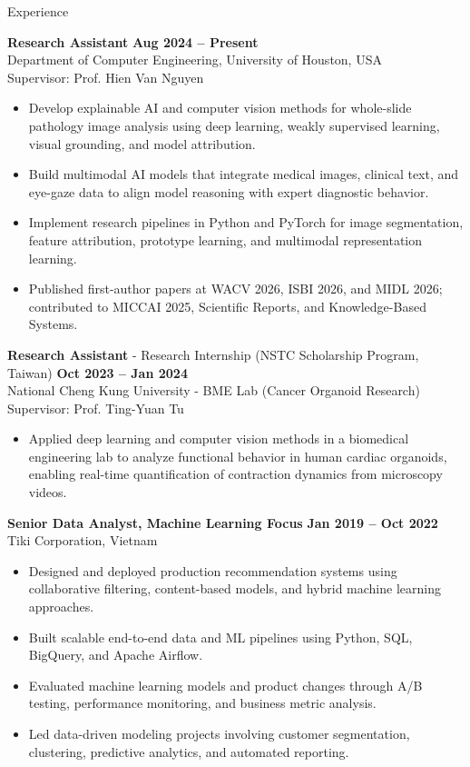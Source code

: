 \documentclass[11pt]{resume}
\begin{document}
\begin{rSection}{Experience}

\textbf{Research Assistant} \hfill \textbf{Aug 2024 – Present} \\
Department of Computer Engineering, University of Houston, USA \\
Supervisor: Prof. Hien Van Nguyen

\begin{itemize}
    \item Develop explainable AI and computer vision methods for whole-slide pathology image analysis using deep learning, weakly supervised learning, visual grounding, and model attribution.
    \item Build multimodal AI models that integrate medical images, clinical text, and eye-gaze data to align model reasoning with expert diagnostic behavior.
    \item Implement research pipelines in Python and PyTorch for image segmentation, feature attribution, prototype learning, and multimodal representation learning.
    \item Published first-author papers at WACV 2026, ISBI 2026, and MIDL 2026; contributed to MICCAI 2025, Scientific Reports, and Knowledge-Based Systems.
\end{itemize}

\textbf{Research Assistant} - Research Internship (NSTC Scholarship Program, Taiwan)
  \hfill \textbf{Oct 2023 -- Jan 2024} \\
National Cheng Kung University - BME Lab (Cancer Organoid Research) \\
Supervisor: Prof. Ting-Yuan Tu
\begin{itemize}
    \item Applied deep learning and computer vision methods in a biomedical engineering lab to analyze functional behavior in human cardiac organoids, enabling real-time quantification of contraction dynamics from microscopy videos.
\end{itemize}

\textbf{Senior Data Analyst, Machine Learning Focus} \hfill \textbf{Jan 2019 -- Oct 2022} \\
Tiki Corporation, Vietnam
\begin{itemize}
  \item Designed and deployed production recommendation systems using collaborative filtering, content-based models, and hybrid machine learning approaches.
  \item Built scalable end-to-end data and ML pipelines using Python, SQL, BigQuery, and Apache Airflow.
  \item Evaluated machine learning models and product changes through A/B testing, performance monitoring, and business metric analysis.
  \item Led data-driven modeling projects involving customer segmentation, clustering, predictive analytics, and automated reporting.
\end{itemize}


\end{rSection}
\end{document}

